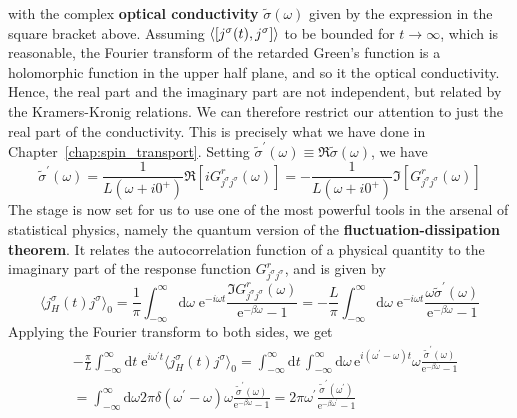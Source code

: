 with the complex \textbf{optical conductivity} \(\tilde{\sigma} (\omega )\) given by the expression in the square bracket above.
Assuming \(\langle \comm{j^{\sigma }(t)}{j^{\sigma }} \rangle \) to be bounded for \(t \to \infty \), which is reasonable,
the Fourier transform of the retarded Green's function is a holomorphic function in the upper half plane, and so it
the optical conductivity. Hence, the real part and the imaginary part are not independent, but related by the Kramers-Kronig relations.
We can therefore restrict our attention to just the real part of the conductivity. This is precisely what we have done
in Chapter~\ref{chap:spin_transport}. Setting \(\tilde{\sigma}^{\prime}(\omega ) \equiv \Re \tilde{\sigma}(\omega )\), we have
\begin{equation}
    \tilde{\sigma}^{\prime}(\omega ) = \frac{1}{L(\omega + i 0^{+})} \Re \left[ i G^r_{j^{\sigma }j^{\sigma }}(\omega ) \right]
    = - \frac{1}{L(\omega + i 0^{+})} \Im \left[ G^r_{j^{\sigma }j^{\sigma }}(\omega ) \right]
\end{equation}
The stage is now set for us to use one of the most powerful tools in the arsenal of statistical physics, namely the
quantum version of the \textbf{fluctuation-dissipation theorem}. It relates the autocorrelation function of a physical quantity
to the imaginary part of the response function \(G^r_{j^{\sigma }j^{\sigma }}\), and is given by
\begin{equation}
    \langle j^{\sigma }_{H}(t) j^{\sigma } \rangle_0 = \frac{1}{\pi } \int_{-\infty }^{\infty } \mathrm{d} \omega \;
    \mathrm{e}^{-i \omega  t} \frac{\Im G^r_{j^{\sigma }j^{\sigma }}(\omega )}{\mathrm{e}^{-\beta \omega } -1}
    = -\frac{L}{\pi } \int_{-\infty }^{\infty } \mathrm{d} \omega \; \mathrm{e}^{-i \omega  t} \frac{\omega \tilde{\sigma }^{\prime} (\omega )}{\mathrm{e}^{-\beta  \omega } - 1 }
\end{equation}
Applying the Fourier transform to both sides, we get
\begin{align}
     & -\frac{\pi}{L} \int_{-\infty }^{\infty } \mathrm{d} t \; \mathrm{e}^{i \omega^{\prime}  t} \langle j^{\sigma }_{H}(t) j^{\sigma } \rangle_0 =
    \int_{-\infty }^{\infty } \mathrm{d} t \, \int_{-\infty}^{\infty}  \mathrm{d} \omega \, \mathrm{e}^{i(\omega^{\prime} -\omega )t}
    \omega \frac{\tilde{\sigma}^{\prime} (\omega )}{\mathrm{e}^{-\beta \omega } - 1 }\nonumber\\
    & =\int_{-\infty}^{\infty} \mathrm{d}\omega 2\pi  \delta (\omega ^{\prime} -\omega  ) \omega \frac{\tilde{\sigma}^{\prime} (\omega )}{\mathrm{e}^{-\beta \omega } - 1 }
    = 2\pi \omega^{\prime} \frac{\tilde{\sigma}^{\prime} (\omega^{\prime} )}{\mathrm{e}^{-\beta \omega^{\prime} } - 1 }
\end{align}
